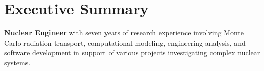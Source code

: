 
\section{Executive Summary}

\begin{justify}
\textbf{Nuclear Engineer} with seven years of research experience involving Monte Carlo
radiation transport, computational
modeling, engineering analysis, and software development in support of various
projects investigating complex nuclear systems.
\end{justify}

